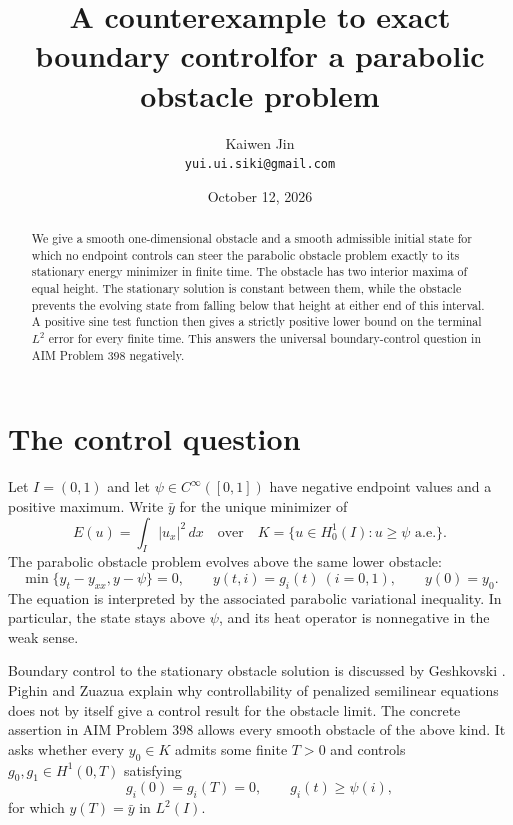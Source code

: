 \documentclass[11pt]{article}
\title{A counterexample to exact boundary control\newline for a parabolic obstacle problem}
\author{Kaiwen Jin\\\small\texttt{yui.ui.siki@gmail.com}}
\date{October 12, 2026}
\begin{document}
\maketitle

\begin{abstract}
We give a smooth one-dimensional obstacle and a smooth admissible initial
state for which no endpoint controls can steer the parabolic obstacle
problem exactly to its stationary energy minimizer in finite time.
The obstacle has two interior maxima of equal height. The stationary
solution is constant between them, while the obstacle prevents the evolving
state from falling below that height at either end of this interval.
A positive sine test function then gives a strictly positive lower bound on
the terminal $L^2$ error for every finite time. This answers the universal
boundary-control question in AIM Problem 398 negatively.
\end{abstract}

\section{The control question}

Let $I=(0,1)$ and let $\psi\in C^\infty([0,1])$ have negative endpoint
values and a positive maximum. Write $\bar y$ for the unique minimizer of
\[
 E(u)=\int_I |u_x|^2\,dx
 \quad\text{over}\quad
 K=\{u\in H^1_0(I):u\ge\psi\text{ a.e.}\}.
\]
The parabolic obstacle problem evolves above the same lower obstacle:
\begin{equation}\label{eq:obstacle}
 \min\{y_t-y_{xx},y-\psi\}=0,\qquad
 y(t,i)=g_i(t)\ (i=0,1),\qquad y(0)=y_0.
\end{equation}
The equation is interpreted by the associated parabolic variational
inequality. In particular, the state stays above $\psi$, and its heat
operator is nonnegative in the weak sense.

Boundary control to the stationary obstacle solution is discussed by
Geshkovski \cite[Section 1.5.1, pp.~37--39]{geshkovski}.
Pighin and Zuazua \cite[Section 7.3]{pighin} explain why controllability of
penalized semilinear equations does not by itself give a control result for
the obstacle limit. The concrete assertion in AIM Problem 398
\cite{aim398} allows every smooth obstacle of the above kind. It asks whether
every $y_0\in K$ admits some finite $T>0$ and controls
$g_0,g_1\in H^1(0,T)$ satisfying
\begin{equation}\label{eq:controls}
 g_i(0)=g_i(T)=0,\qquad g_i(t)\ge\psi(i),
\end{equation}
for which $y(T)=\bar y$ in $L^2(I)$.
\end{document}
